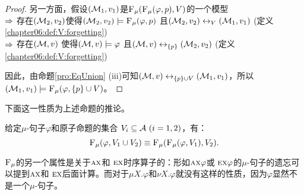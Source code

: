 \begin{proof}
	另一方面，假设$({\cal M}_1,v_1)$是${\textsc{F}_{\textsc{$\mu$}}}({\textsc{F}_{\textsc{$\mu$}}}(\varphi, p), V)$的一个模型\\
	$\Rightarrow$ 存在$({\cal M}_2,v_2)$使得$({\cal M}_2,v_2) \models  {\textsc{F}_{\textsc{$\mu$}}}(\varphi, p)$ 且$({\cal M}_2,v_2) \leftrightarrow_V ({\cal M}_1,v_1)$ \hfill(定义\ref{chapter06:def:V:forgetting})\\
	$\Rightarrow$ 存在$({\cal M},v)$ 使得$({\cal M},v) \models \varphi$ 且$({\cal M},v) \leftrightarrow_{\{p\}} ({\cal M}_2,v_2)$ \hfill(定义\ref{chapter06:def:V:forgetting}) 
	
	因此，由命题\ref{pro:EqUnion} (iii)可知$({\cal M},v) \leftrightarrow_{\{p\} \cup V} ({\cal M}_1,v_1)$，所以$({\cal M}_1,v_1) \models {\textsc{F}_{\textsc{$\mu$}}}(\varphi, \{p\} \cup V)$。
\end{proof}


下面这一性质为上述命题的推论。

\begin{corollary}[切片性]\label{chapter06:disTFV}
	给定$\mu$-句子$\varphi$和原子命题的集合 $V_i\subseteq{\cal A}~(i=1,2)$，有：
	\[
	{\textsc{F}_{\textsc{$\mu$}}}(\varphi, V_1 \cup V_2) \equiv {\textsc{F}_{\textsc{$\mu$}}}({\textsc{F}_{\textsc{$\mu$}}}(\varphi, V_1), V_2).
	\]
\end{corollary}

${\textsc{F}_{\textsc{$\mu$}}}$的另一个属性是关于$\textsc{a}\textsc{x}$和 $\textsc{e} \textsc{x}$时序算子的：形如$\textsc{a}\textsc{x} \varphi$或 $\textsc{e} \textsc{x} \varphi$的$\mu$-句子的遗忘可以提到$\textsc{a}\textsc{x}$和 $\textsc{e} \textsc{x}$后面计算。而对于$\mu X. \varphi$和$\nu X. \varphi$就没有这样的性质，因为$\varphi$显然不是一个$\mu$-句子。


